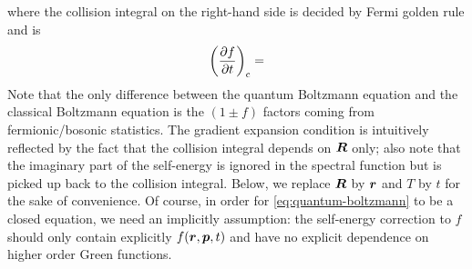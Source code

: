 \documentclass[hyperref, a4paper]{article}
\begin{document}
where the collision integral on the right-hand side is decided by Fermi golden rule 
and is 
\begin{equation}
    \left(\pdv{f}{t}\right)_{\text{c}} = 
\end{equation}
Note that the only difference between the quantum Boltzmann equation 
and the classical Boltzmann equation 
is the $(1 \pm f)$ factors coming from fermionic/bosonic statistics.
The gradient expansion condition is intuitively reflected 
by the fact that the collision integral depends on $\vb*{R}$ only;
also note that the imaginary part of the self-energy is ignored 
in the spectral function
but is picked up back to the collision integral.
Below, we replace $\vb*{R}$ by $\vb*{r}$ 
and $T$ by $t$
for the sake of convenience.
Of course, in order for \eqref{eq:quantum-boltzmann} to be a closed equation,
we need an implicitly assumption:
the self-energy correction to $f$ should only contain explicitly $f(\vb*{r}, \vb*{p}, t)$
and have no explicit dependence on higher order Green functions.
\end{document}
